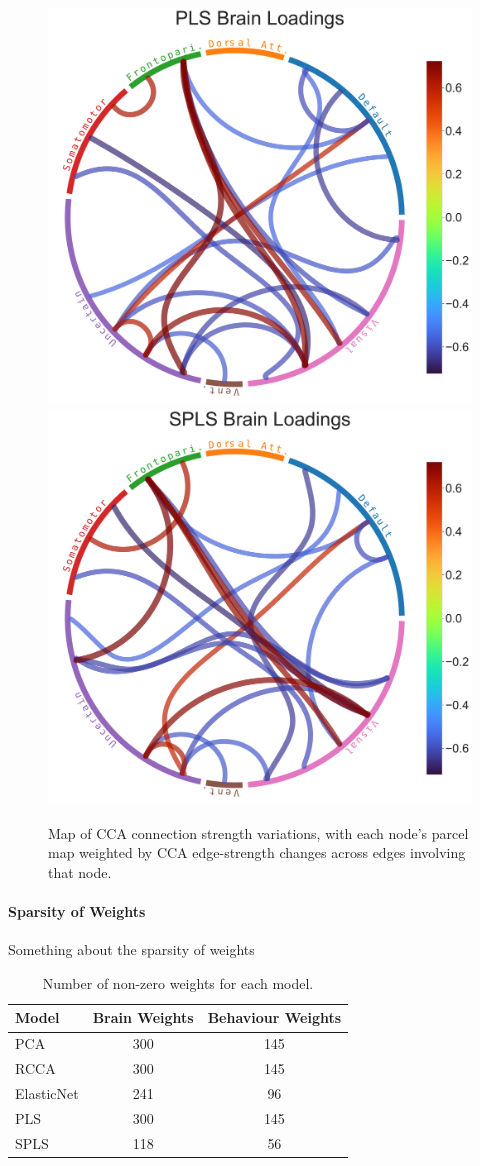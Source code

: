 \begin{figure}
\includegraphics[width=0.68\linewidth]{figures/regularization/hcp/PLS brain loadings.pdf}
\includegraphics[width=0.68\linewidth]{figures/regularization/hcp/SPLS brain loadings.pdf}
\caption{Map of CCA connection strength variations, with each node’s parcel map weighted by CCA edge-strength changes across edges involving that node.}\label{fig:brain}
\end{figure}


\paragraph{Sparsity of Weights} Something about the sparsity of weights

\begin{table}[h]
\centering
\caption{Number of non-zero weights for each model.}
\begin{tabular}{|l|c|c|}
\hline
Model &  Brain Weights &  Behaviour Weights \\
\hline
PCA        &            300 &                145 \\
RCCA       &            300 &                145 \\
ElasticNet &            241 &                 96 \\
PLS        &            300 &                145 \\
SPLS       &            118 &                 56 \\
\hline
\end{tabular}\label{table:brain-behaviour-weights}
\end{table}



